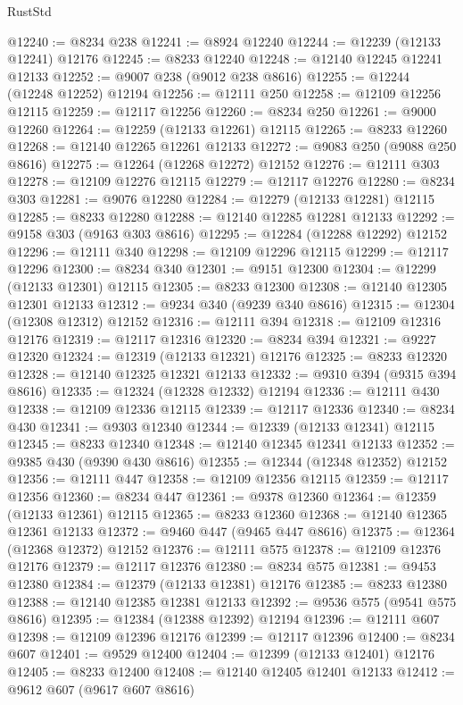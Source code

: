 \begin{lexlean}{RustStd}
\begin{coremodule}
@12240 := @8234 @238
@12241 := @8924 @12240
@12244 := @12239 (@12133 @12241) @12176
@12245 := @8233 @12240
@12248 := @12140 @12245 @12241 @12133
@12252 := @9007 @238 (@9012 @238 @8616)
@12255 := @12244 (@12248 @12252) @12194
@12256 := @12111 @250
@12258 := @12109 @12256 @12115
@12259 := @12117 @12256
@12260 := @8234 @250
@12261 := @9000 @12260
@12264 := @12259 (@12133 @12261) @12115
@12265 := @8233 @12260
@12268 := @12140 @12265 @12261 @12133
@12272 := @9083 @250 (@9088 @250 @8616)
@12275 := @12264 (@12268 @12272) @12152
@12276 := @12111 @303
@12278 := @12109 @12276 @12115
@12279 := @12117 @12276
@12280 := @8234 @303
@12281 := @9076 @12280
@12284 := @12279 (@12133 @12281) @12115
@12285 := @8233 @12280
@12288 := @12140 @12285 @12281 @12133
@12292 := @9158 @303 (@9163 @303 @8616)
@12295 := @12284 (@12288 @12292) @12152
@12296 := @12111 @340
@12298 := @12109 @12296 @12115
@12299 := @12117 @12296
@12300 := @8234 @340
@12301 := @9151 @12300
@12304 := @12299 (@12133 @12301) @12115
@12305 := @8233 @12300
@12308 := @12140 @12305 @12301 @12133
@12312 := @9234 @340 (@9239 @340 @8616)
@12315 := @12304 (@12308 @12312) @12152
@12316 := @12111 @394
@12318 := @12109 @12316 @12176
@12319 := @12117 @12316
@12320 := @8234 @394
@12321 := @9227 @12320
@12324 := @12319 (@12133 @12321) @12176
@12325 := @8233 @12320
@12328 := @12140 @12325 @12321 @12133
@12332 := @9310 @394 (@9315 @394 @8616)
@12335 := @12324 (@12328 @12332) @12194
@12336 := @12111 @430
@12338 := @12109 @12336 @12115
@12339 := @12117 @12336
@12340 := @8234 @430
@12341 := @9303 @12340
@12344 := @12339 (@12133 @12341) @12115
@12345 := @8233 @12340
@12348 := @12140 @12345 @12341 @12133
@12352 := @9385 @430 (@9390 @430 @8616)
@12355 := @12344 (@12348 @12352) @12152
@12356 := @12111 @447
@12358 := @12109 @12356 @12115
@12359 := @12117 @12356
@12360 := @8234 @447
@12361 := @9378 @12360
@12364 := @12359 (@12133 @12361) @12115
@12365 := @8233 @12360
@12368 := @12140 @12365 @12361 @12133
@12372 := @9460 @447 (@9465 @447 @8616)
@12375 := @12364 (@12368 @12372) @12152
@12376 := @12111 @575
@12378 := @12109 @12376 @12176
@12379 := @12117 @12376
@12380 := @8234 @575
@12381 := @9453 @12380
@12384 := @12379 (@12133 @12381) @12176
@12385 := @8233 @12380
@12388 := @12140 @12385 @12381 @12133
@12392 := @9536 @575 (@9541 @575 @8616)
@12395 := @12384 (@12388 @12392) @12194
@12396 := @12111 @607
@12398 := @12109 @12396 @12176
@12399 := @12117 @12396
@12400 := @8234 @607
@12401 := @9529 @12400
@12404 := @12399 (@12133 @12401) @12176
@12405 := @8233 @12400
@12408 := @12140 @12405 @12401 @12133
@12412 := @9612 @607 (@9617 @607 @8616)

\end{coremodule}
\end{lexlean}
